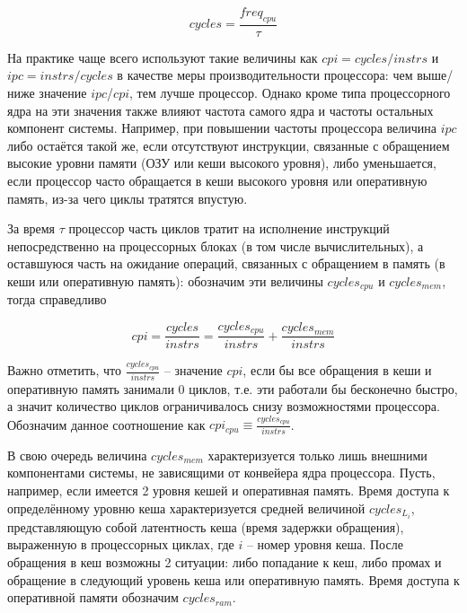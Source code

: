     \begin{equation} \label{cycles_base}
        cycles = \frac{freq_{cpu}}{\tau}
    \end{equation}

    На практике чаще всего используют такие величины как $cpi = cycles / instrs$ и
    $ipc = instrs / cycles$ в качестве меры производительности процессора: чем выше/ниже значение
    $ipc$/$cpi$, тем лучше процессор. Однако кроме типа процессорного ядра на эти значения также
    влияют частота самого ядра и частоты остальных компонент системы. Например, при повышении частоты
    процессора величина $ipc$ либо остаётся такой же, если отсутствуют инструкции, связанные с
    обращением высокие уровни памяти (ОЗУ или кеши высокого уровня), либо уменьшается, если
    процессор часто обращается в кеши высокого уровня или оперативную память, из-за чего циклы тратятся
    впустую.

    За время $\tau$ процессор часть циклов тратит на исполнение инструкций непосредственно на
    процессорных блоках (в том числе вычислительных), а оставшуюся часть на ожидание операций,
    связанных с обращением в память (в кеши или оперативную память): обозначим эти величины
    $cycles_{cpu}$ и $cycles_{mem}$, тогда справедливо

    \begin{equation}
        cpi = \frac{cycles}{instrs} = \frac{cycles_{cpu}}{instrs} + \frac{cycles_{mem}}{instrs}
    \end{equation}

    Важно отметить, что $\frac{cycles_{cpu}}{instrs}$ -- значение $cpi$, если бы все обращения
    в кеши и оперативную память занимали 0 циклов, т.е. эти работали бы бесконечно быстро, а значит
    количество циклов ограничивалось снизу возможностями процессора. Обозначим данное соотношение
    как $cpi_{cpu} \equiv \frac{cycles_{cpu}}{instrs}$.

    В свою очередь величина $cycles_{mem}$ характеризуется только лишь внешними компонентами системы,
    не зависящими от конвейера ядра процессора. Пусть, например, если имеется 2 уровня кешей и оперативная память.
    Время доступа к определённому уровню кеша характеризуется средней величиной $cycles_{L_{i}}$,
    представляющую собой латентность кеша (время задержки обращения), выраженную в процессорных
    циклах, где $i$ -- номер уровня кеша.
    После обращения в кеш возможны 2 ситуации: либо попадание к кеш, либо промах и обращение в
    следующий уровень кеша или оперативную память.
    Время доступа к оперативной памяти обозначим $cycles_{ram}$.

